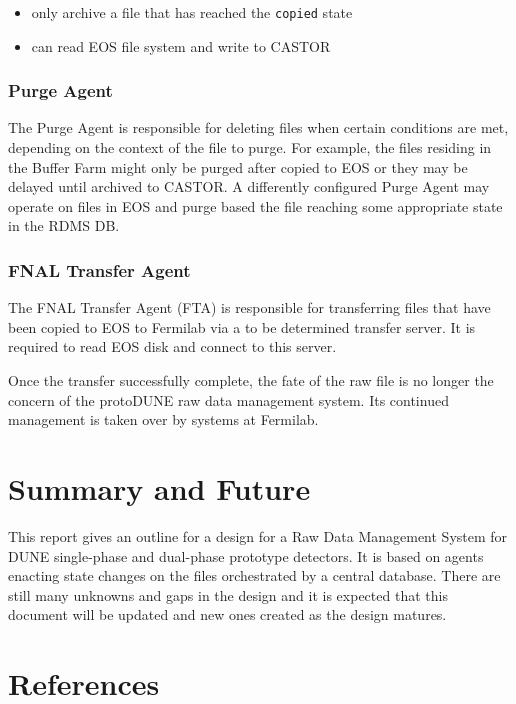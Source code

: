 \documentclass[pdftex,12pt,letter]{article}
\begin{document}
\begin{itemize}
\item only archive a file that has reached the \texttt{copied} state
\item can read EOS file system and write to CASTOR
\end{itemize}

\subsubsection{Purge Agent}

The Purge Agent is responsible for deleting files when certain
conditions are met, depending on the context of the file to purge.
For example, the files residing in the Buffer Farm might only be purged after copied to EOS or they
may be delayed until archived to CASTOR.  A differently configured
Purge Agent may operate on files in EOS and purge based the file
reaching some appropriate state in the RDMS DB.

\subsubsection{FNAL Transfer Agent}

The FNAL Transfer Agent (FTA) is responsible for transferring files
that have been copied to EOS to Fermilab via a to be determined
transfer server.  It is required to read EOS disk and connect to this
server.  

Once the transfer successfully complete, the fate of the raw file is
no longer the concern of the protoDUNE raw data management system.
Its continued management is taken over by systems at Fermilab.

\section{Summary and Future}

This report gives an outline for a design for a Raw Data Management System for DUNE single-phase and dual-phase prototype detectors.
It is based on agents enacting state changes on the files orchestrated by a central database.  There are still many unknowns and gaps in the
design and it is expected that this document will be updated and new ones created as the design matures.



\section{References}

\end{document}
